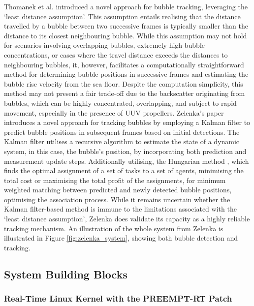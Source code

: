 Thomanek et al. introduced a novel approach for bubble tracking, leveraging the `least distance assumption'. This assumption entails realising that the distance travelled by a bubble between two successive frames is typically smaller than the distance to its closest neighbouring bubble. While this assumption may not hold for scenarios involving overlapping bubbles, extremely high bubble concentrations, or cases where the travel distance exceeds the distances to neighbouring bubbles, it, however, facilitates a computationally straightforward method for determining bubble positions in successive frames and estimating the bubble rise velocity from the sea floor. Despite the computation simplicity, this method may not present a fair trade-off due to the backscatter originating from bubbles, which can be highly concentrated, overlapping, and subject to rapid movement, especially in the presence of UUV propellers. Zelenka's paper introduces a novel approach for tracking bubbles by employing a Kalman filter \cite{kalmanNewApproachLinear1960} to predict bubble positions in subsequent frames based on initial detections. The Kalman filter utilises a recursive algorithm to estimate the state of a dynamic system, in this case, the bubble's position, by incorporating both prediction and measurement update steps. Additionally utilising, the Hungarian method \cite{kuhnHungarianMethodAssignment1955}, which finds the optimal assignment of a set of tasks to a set of agents, minimising the total cost or maximising the total profit of the assignments, for minimum weighted matching between predicted and newly detected bubble positions, optimising the association process. While it remains uncertain whether the Kalman filter-based method is immune to the limitations associated with the `least distance assumption', Zelenka does validate its capacity as a highly reliable tracking mechanism. An illustration of the whole system from Zelenka is illustrated in Figure \ref{fig:zelenka_system}, showing both bubble detection and tracking.

\subsection{System Building Blocks}
\label{buildingblocks}

\subsubsection{Real-Time Linux Kernel with the PREEMPT-RT Patch}
\label{preempt}

